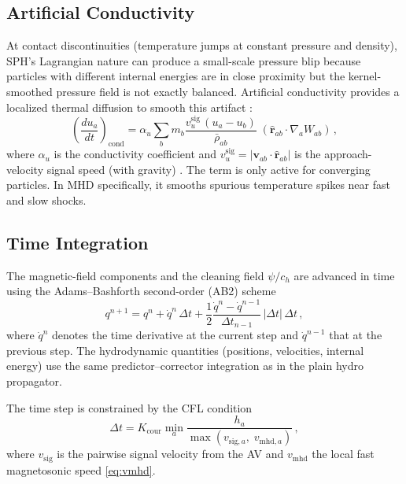 

\subsection{Artificial Conductivity}
\label{sec:ac}

At contact discontinuities (temperature jumps at constant pressure and density), SPH's Lagrangian nature can produce a small-scale pressure blip because particles with different internal energies are in close proximity but the kernel-smoothed pressure field is not exactly balanced. Artificial conductivity provides a localized thermal diffusion to smooth this artifact \cite{Price2018}:
\begin{equation}
    \left(\frac{du_a}{dt}\right)_\mathrm{cond} = \alpha_u \sum_b m_b \frac{v^\mathrm{sig}_u \, (u_a - u_b)}{\bar{\rho}_{ab}}\; (\hat{\mathbf{r}}_{ab} \cdot \nabla_a W_{ab})\,,
    \label{eq:ac}
\end{equation}
where $\alpha_u$ is the conductivity coefficient and $v^\mathrm{sig}_u = |\mathbf{v}_{ab} \cdot \hat{\mathbf{r}}_{ab}|$ is the approach-velocity signal speed (with gravity) \cite{Rosswog2009}. The term is only active for converging particles. In MHD specifically, it smooths spurious temperature spikes near fast and slow shocks.


\subsection{Time Integration}
\label{sec:timeint}

The magnetic-field components and the cleaning field $\psi/c_h$ are advanced in time using the Adams--Bashforth second-order (AB2) scheme
\begin{equation}
    q^{n+1} = q^n + \dot{q}^n \, \Delta t + \frac{1}{2}\frac{\dot{q}^n - \dot{q}^{n-1}}{\Delta t_{n-1}}\, |\Delta t|\, \Delta t\,,
    \label{eq:ab2}
\end{equation}
where $\dot{q}^n$ denotes the time derivative at the current step and $\dot{q}^{n-1}$ that at the previous step. The hydrodynamic quantities (positions, velocities, internal energy) use the same predictor--corrector integration as in the plain hydro propagator.

The time step is constrained by the CFL condition
\begin{equation}
    \Delta t = K_\mathrm{cour} \min_a \frac{h_a}{\max(v_{\mathrm{sig},a},\; v_{\mathrm{mhd},a})}\,,
    \label{eq:cfl}
\end{equation}
where $v_\mathrm{sig}$ is the pairwise signal velocity from the AV and $v_\mathrm{mhd}$ the local fast magnetosonic speed \eqref{eq:vmhd}.
